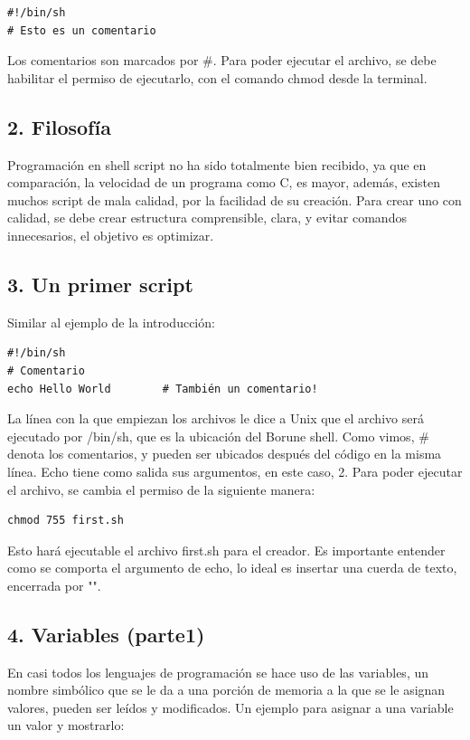 \documentclass[a4paper]{article}
\begin{document}
\begin{verbatim}
#!/bin/sh
# Esto es un comentario
\end{verbatim}

Los comentarios son marcados por \#. Para poder ejecutar el archivo, se debe habilitar el permiso de ejecutarlo, con el comando chmod desde la terminal.

\subsection*{2. Filosofía}

Programación en shell script no ha sido totalmente bien recibido, ya que en comparación, la velocidad de un programa como C, es mayor, además, existen muchos script de mala calidad, por la facilidad de su creación. Para crear uno con calidad, se debe crear estructura comprensible, clara, y evitar comandos innecesarios, el objetivo es optimizar.

\subsection*{3. Un primer script}

Similar al ejemplo de la introducción:

\begin{verbatim}
#!/bin/sh
# Comentario
echo Hello World        # También un comentario!
\end{verbatim}

La línea con la que empiezan los archivos le dice a Unix que el archivo será ejecutado por /bin/sh, que es la ubicación del Borune shell. Como vimos, \# denota los comentarios, y pueden ser ubicados después del código en la misma línea. Echo tiene como salida sus argumentos, en este caso, 2. Para poder ejecutar el archivo, se cambia el permiso de la siguiente manera:

\begin{verbatim}
chmod 755 first.sh
\end{verbatim}

Esto hará ejecutable el archivo first.sh para el creador. Es importante entender como se comporta el argumento de echo, lo ideal es insertar una cuerda de texto, encerrada por "".

\subsection*{4. Variables (parte1)}

En casi todos los lenguajes de programación se hace uso de las variables, un nombre simbólico que se le da a una porción de memoria a la que se le asignan valores, pueden ser leídos y modificados. Un ejemplo para asignar a una variable un valor y mostrarlo:
\end{document}
